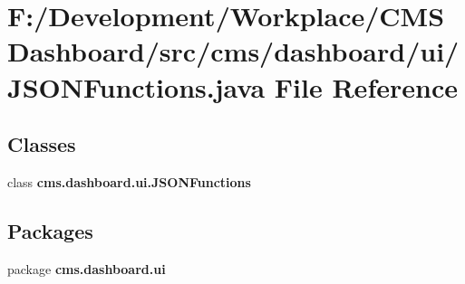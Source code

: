 \section{\-F\-:/\-Development/\-Workplace/\-C\-M\-S \-Dashboard/src/cms/dashboard/ui/\-J\-S\-O\-N\-Functions.java \-File \-Reference}
\label{_j_s_o_n_functions_8java}
\subsection*{\-Classes}
\begin{DoxyCompactItemize}
\item 
class {\bf cms.\-dashboard.\-ui.\-J\-S\-O\-N\-Functions}
\end{DoxyCompactItemize}
\subsection*{\-Packages}
\begin{DoxyCompactItemize}
\item 
package {\bf cms.\-dashboard.\-ui}
\end{DoxyCompactItemize}
